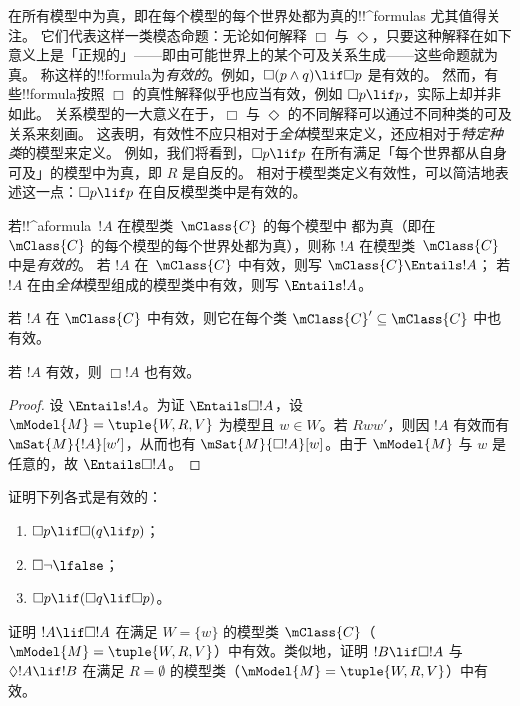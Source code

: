 \documentclass[../../../include/open-logic-section]{subfiles}
\begin{document}


\begin{explain}
  在所有模型中为真，即在每个模型的每个世界处都为真的!!^{formula}s 尤其值得关注。
  它们代表这样一类模态命题：无论如何解释 $\Box$ 与 $\Diamond$，只要这种解释在如下意义上是「正规的」——即由可能世界上的某个可及关系生成——这些命题就为真。
  称这样的!!{formula}为\emph{有效的}。例如，$\Box(p \land q) \lif \Box p$ 是有效的。
  然而，有些!!{formula}按照 $\Box$ 的真性解释似乎也应当有效，例如 $\Box p \lif p$，实际上却并非如此。
  关系模型的一大意义在于，$\Box$ 与 $\Diamond$ 的不同解释可以通过不同种类的可及关系来刻画。
  这表明，有效性不应只相对于\emph{全体}模型来定义，还应相对于\emph{特定种类}的模型来定义。
  例如，我们将看到，$\Box p \lif p$ 在所有满足「每个世界都从自身可及」的模型中为真，即 $R$ 是自反的。
  相对于模型类定义有效性，可以简洁地表述这一点：$\Box p \lif p$ 在自反模型类中是有效的。
\end{explain}

\begin{defn}
  若!!^a{formula}~$!A$ 在模型类~$\mClass{C}$ 的每个模型中
  都为真（即在~$\mClass{C}$ 的每个模型的每个世界处都为真），则称 $!A$ 在模型类~$\mClass{C}$ 中是\emph{有效的}。
  若 $!A$ 在~$\mClass{C}$ 中有效，则写 $\mClass{C} \Entails !A$；
  若 $!A$ 在由\emph{全体}模型组成的模型类中有效，则写 $\Entails !A$。
\end{defn}

\begin{prop}
  若 $!A$ 在 $\mClass{C}$ 中有效，则它在每个类
  $\mClass{C}' \subseteq \mClass{C}$ 中也有效。
\end{prop}

\begin{prop}
  若 $!A$ 有效，则 $\Box!A$ 也有效。
\end{prop}

\begin{proof}
  设 $\Entails !A$。为证 $\Entails \Box!A$，设 $\mModel{M} =
  \tuple{W, R, V}$ 为模型且 $w \in W$。若 $Rww'$，则因 $!A$ 有效而有
  $\mSat{M}{!A}[w']$，从而也有 $\mSat{M}{\Box!A}[w]$。由于
  $\mModel{M}$ 与 $w$ 是任意的，故 $\Entails \Box!A$。
\end{proof}

\begin{prob}
  证明下列各式是有效的：
  \begin{enumerate}
  \item $\Box p \lif \Box (q \lif p)$；
  \item $\Box \lnot \lfalse$；
  \item $\Box p \lif (\Box q \lif \Box p)$。
  \end{enumerate}
\end{prob}

\begin{prob}
  证明 $!A \lif \Box!A$ 在满足 $W = \{w\}$ 的模型类
  $\mClass{C}$（$\mModel{M} = \tuple{W, R, V}$）中有效。类似地，证明
  $!B \lif \Box !A$ 与 $\Diamond !A \lif !B$ 在满足
  $R = \emptyset$ 的模型类（$\mModel{M} = \tuple{W, R, V}$）中有效。
\end{prob}
\end{document}
